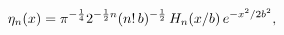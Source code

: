 \[\eta_{n}(x)=\pi^{-\frac{1}{4}}2^{-\frac{1}{2}n}(n!\,b)^{-\frac{1}{2}}\mathop{H%
_{n}\/}\nolimits\!\left(x/b\right)e^{-x^{2}/2b^{2}},\]